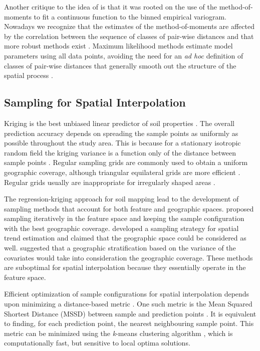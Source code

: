 Another critique to the idea of \citet{BreslerEtAl1982, Russo1984, WarrickEtAl1987} is that it was rooted on 
the use of the method-of-moments to fit a continuous function to the binned empirical variogram. Nowadays we 
recognize that the estimates of the method-of-moments are affected by the correlation between the sequence 
of classes of pair-wise distances and that more robust methods exist \citep{DiggleEtAl2002}. Maximum 
likelihood methods estimate model parameters using all data points, avoiding the need for an \textit{ad hoc} 
definition of classes of pair-wise distances that generally smooth out the structure of the spatial process  
\citep{Lark2000}.

\subsection{Sampling for Spatial Interpolation}

Kriging is the best unbiased linear predictor of soil properties \cite{LarkEtAl2006}. The overall prediction 
accuracy depends on spreading the sample points as uniformly as possible throughout the study area. This is 
because for a stationary isotropic random field the kriging variance is a function only of the distance between 
sample points \cite{Cressie1993}. Regular sampling grids are commonly used to obtain a uniform geographic 
coverage, although triangular equilateral grids are more efficient \cite{WebsterEtAl2007}. Regular grids 
usually are inappropriate for irregularly shaped areas \cite{WalvoortEtAl2010}.

The regression-kriging approach for soil mapping \cite{HenglEtAl2007b} lead to the development of sampling 
methods that account for both feature and geographic spaces. \citet{HenglEtAl2003a} proposed sampling 
iteratively in the feature space and keeping the sample configuration with the best geographic coverage. 
\citet{MinasnyEtAl2006b} developed a sampling strategy for spatial trend estimation and claimed that the 
geographic space could be considered as well. \citet{MinasnyEtAl2007a} suggested that a geographic 
stratification based on the variance of the covariates would take into consideration the geographic coverage. 
These methods are suboptimal for spatial interpolation because they essentially operate in the feature space.

Efficient optimization of sample configurations for spatial interpolation depends upon minimizing a 
distance-based metric \cite{RoyleEtAl1998}. One such metric is the Mean Squared Shortest Distance (MSSD) 
between sample and prediction points \cite{BrusEtAl2006}. It is equivalent to finding, for each prediction 
point, the nearest neighbouring sample point. This metric can be minimized using the \textit{k}-means 
clustering algorithm \cite{WalvoortEtAl2010}, which is computationally fast, but sensitive to local optima 
solutions.

